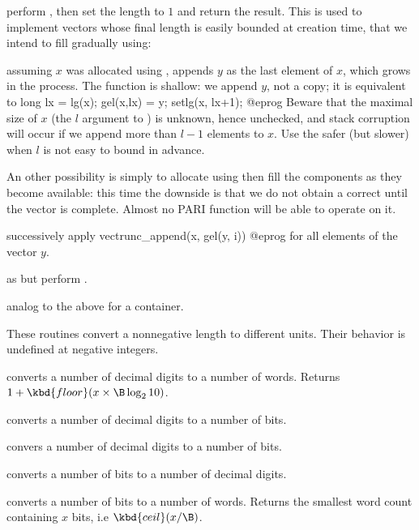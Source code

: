  perform , then
set the length to $1$ and return the result. This is used to  implement
vectors whose final length is easily bounded at creation time, that we intend
to fill gradually using:

 assuming $x$ was allocated using
, appends $y$ as the last element of $x$, which
grows in the process. The function is shallow: we append $y$, not a copy;
it is equivalent to
\bprog
  long lx = lg(x); gel(x,lx) = y; setlg(x, lx+1);
@eprog\noindent
Beware that the maximal size of $x$ (the $l$ argument to )
is unknown, hence unchecked, and stack corruption will occur if we append
more than $l-1$ elements to $x$. Use the safer (but slower)
 when $l$ is not easy to bound in advance.

An other possibility is simply to allocate using  then fill
the components as they become available: this time the downside is that we do
not obtain a correct  until the vector is complete. Almost no PARI
function will be able to operate on it.

 successively apply
\bprog
  vectrunc_append(x, gel(y, i))
@eprog
for all elements of the vector $y$.

 as  but perform
.


 analog to the above for a
 container.


These routines convert a nonnegative length to different units. Their
behavior is undefined at negative integers.

 converts a number of decimal digits to a number
of words. Returns $ 1 + \kbd{floor}(x \times \B \log_2 10)$.

 converts a number of decimal digits to a number
of bits.

 convers a number of decimal digits to a
number of bits.

 converts a number of bits to a
number of decimal digits.

 converts a number of bits to a number of
words. Returns the smallest word count containing $x$ bits, i.e $
\kbd{ceil}(x / \B)$.

